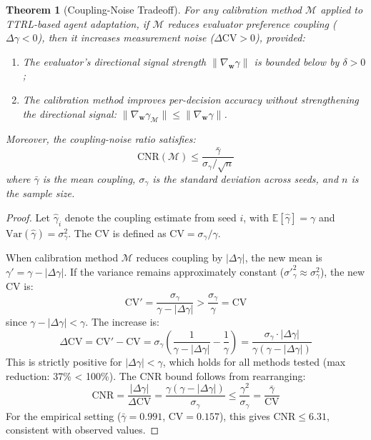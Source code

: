 \documentclass[11pt]{article}
\newcommand{\CV}{\ensuremath{\mathrm{CV}}}
\newtheorem{theorem}{Theorem}
\theoremstyle{definition}
\theoremstyle{remark}
\begin{document}
\begin{theorem}[Coupling-Noise Tradeoff]\label{thm:tradeoff}
For any calibration method $\mathcal{M}$ applied to TTRL-based agent adaptation, if $\mathcal{M}$ reduces evaluator preference coupling ($\Delta\gamma < 0$), then it increases measurement noise ($\Delta\CV > 0$), provided:
\begin{enumerate}[leftmargin=*,nosep]
    \item The evaluator's directional signal strength $\|\nabla_{\mathbf{w}} \gamma\|$ is bounded below by $\delta > 0$;
    \item The calibration method improves per-decision accuracy without strengthening the directional signal: $\|\nabla_{\mathbf{w}} \gamma_{\mathcal{M}}\| \leq \|\nabla_{\mathbf{w}} \gamma\|$.
\end{enumerate}
Moreover, the coupling-noise ratio satisfies:
\begin{equation}
    \text{CNR}(\mathcal{M}) \leq \frac{\bar{\gamma}}{\sigma_{\gamma} / \sqrt{n}}
\end{equation}
where $\bar{\gamma}$ is the mean coupling, $\sigma_{\gamma}$ is the standard deviation across seeds, and $n$ is the sample size.
\end{theorem}

\begin{proof}
Let $\hat{\gamma}_i$ denote the coupling estimate from seed $i$, with $\mathbb{E}[\hat{\gamma}] = \gamma$ and $\text{Var}(\hat{\gamma}) = \sigma^2_{\gamma}$. The CV is defined as $\CV = \sigma_{\gamma} / \gamma$.

When calibration method $\mathcal{M}$ reduces coupling by $|\Delta\gamma|$, the new mean is $\gamma' = \gamma - |\Delta\gamma|$. If the variance remains approximately constant ($\sigma'^2_{\gamma} \approx \sigma^2_{\gamma}$), the new CV is:
\begin{equation}
    \CV' = \frac{\sigma_{\gamma}}{\gamma - |\Delta\gamma|} > \frac{\sigma_{\gamma}}{\gamma} = \CV
\end{equation}
since $\gamma - |\Delta\gamma| < \gamma$. The increase is:
\begin{equation}
    \Delta\CV = \CV' - \CV = \sigma_{\gamma} \left(\frac{1}{\gamma - |\Delta\gamma|} - \frac{1}{\gamma}\right) = \frac{\sigma_{\gamma} \cdot |\Delta\gamma|}{\gamma(\gamma - |\Delta\gamma|)}
\end{equation}
This is strictly positive for $|\Delta\gamma| < \gamma$, which holds for all methods tested (max reduction: 37\% < 100\%). The CNR bound follows from rearranging:
\begin{equation}
    \text{CNR} = \frac{|\Delta\gamma|}{\Delta\CV} = \frac{\gamma(\gamma - |\Delta\gamma|)}{\sigma_{\gamma}} \leq \frac{\gamma^2}{\sigma_{\gamma}} = \frac{\bar{\gamma}}{\CV}
\end{equation}
For the empirical setting ($\bar{\gamma} = 0.991$, $\CV = 0.157$), this gives $\text{CNR} \leq 6.31$, consistent with observed values.
\end{proof}
\end{document}
